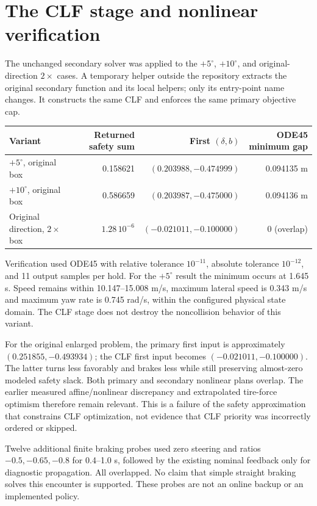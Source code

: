 \documentclass[11pt]{article}
\begin{document}
\section{The CLF stage and nonlinear verification}
The unchanged secondary solver was applied to the $+5^\circ$, $+10^\circ$,
and original-direction $2\times$ cases. A temporary helper outside the
repository extracts the original secondary function and its local helpers;
only its entry-point name changes. It constructs the same CLF and enforces
the same primary objective cap.
\begin{center}\small
\begin{tabular}{lrrr}
\toprule
Variant & Returned safety sum & First $(\delta,b)$ & ODE45 minimum gap\\
\midrule
$+5^\circ$, original box & 0.158621 & $(0.203988,-0.474999)$ & 0.094135 m\\
$+10^\circ$, original box & 0.586659 & $(0.203987,-0.475000)$ & 0.094136 m\\
Original direction, $2\times$ box & $1.28\,10^{-6}$ & $(-0.021011,-0.100000)$ & 0 (overlap)\\
\bottomrule
\end{tabular}
\end{center}
Verification used ODE45 with relative tolerance $10^{-11}$, absolute tolerance
$10^{-12}$, and 11 output samples per hold. For the $+5^\circ$ result the
minimum occurs at 1.645 s. Speed remains within 10.147--15.008 m/s, maximum
lateral speed is 0.343 m/s and maximum yaw rate is 0.745 rad/s, within the
configured physical state domain. The CLF stage does not destroy the
noncollision behavior of this variant.

For the original enlarged problem, the primary first input is approximately
$(0.251855,-0.493934)$; the CLF first input becomes
$(-0.021011,-0.100000)$. The latter turns less favorably and brakes less while
still preserving almost-zero modeled safety slack. Both primary and secondary
nonlinear plans overlap. The earlier measured affine/nonlinear discrepancy
and extrapolated tire-force optimism therefore remain relevant. This is a
failure of the safety approximation that constrains CLF optimization, not
evidence that CLF priority was incorrectly ordered or skipped.

Twelve additional finite braking probes used zero steering and ratios
$-0.5,-0.65,-0.8$ for 0.4--1.0 s, followed by the existing nominal feedback
only for diagnostic propagation. All overlapped. No claim that simple
straight braking solves this encounter is supported. These probes are not
an online backup or an implemented policy.
\end{document}
